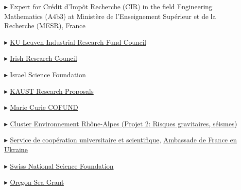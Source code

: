   \begin{itemize}

    \item[$\blacktriangleright$] Expert for Cr\'edit d'Imp\^ot Recherche (CIR) in the field Engineering Mathematics (A4b3) at Minist\`ere de l'Enseignement Sup\'erieur et de la Recherche (MESR), France

    \item[$\blacktriangleright$] \href{https://research.kuleuven.be/en/collaborate/science_business/iof/}{KU Leuven Industrial Research Fund Council}
  
    \item[$\blacktriangleright$] \href{http://research.ie/}{Irish Research Council}
    
    \item[$\blacktriangleright$] \href{https://www.isf.org.il/}{Israel Science Foundation}
    
    \item[$\blacktriangleright$] \href{https://www.kaust.edu.sa/en}{KAUST Research Proposals}
  
    \item[$\blacktriangleright$] \href{http://www.ulg.ac.be/cms/rv_2913816/en/about}{Marie Curie COFUND}
    
    \item[$\blacktriangleright$] \href{http://www.cluster-environnement.net/le-programme-scientifique/les-projets}%
    {Cluster Environnement Rh\^one-Alpes (Projet 2: Risques gravitaires, s\'eismes)}
    
    \item[$\blacktriangleright$] \href{http://ambafrance-ua.org/spip.php?article1409}%
    {Service de coop\'eration universitaire et scientifique}, \href{http://ambafrance-ua.org/spip.php?article1409}%
    {Ambassade de France en Ukraine}

    \item[$\blacktriangleright$] \href{https://www.snf.ch/en/}{Swiss National Science Foundation}
    
    \item[$\blacktriangleright$] \href{http://seagrant.oregonstate.edu/}{Oregon Sea Grant}
    
  \end{itemize}